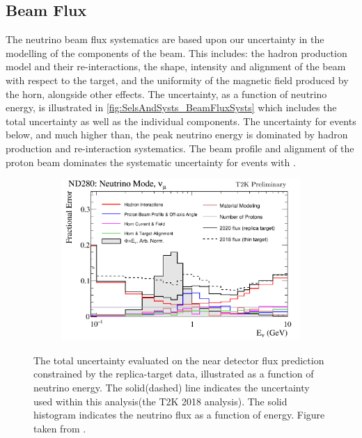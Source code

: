 \subsection{Beam Flux}
\label{sec:SelsAndSysts_Systs_BeamFlux}

The neutrino beam flux systematics are based upon our uncertainty in the modelling of the components of the beam. This includes: the hadron production model and their re-interactions, the shape, intensity and alignment of the beam with respect to the target, and the uniformity of the magnetic field produced by the horn, alongside other effects. The uncertainty, as a function of neutrino energy, is illustrated in \autoref{fig:SelsAndSysts_BeamFluxSysts} which includes the total uncertainty as well as the individual components. The uncertainty for events below, and much higher than, the peak neutrino energy is dominated by hadron production and re-interaction systematics. The beam profile and alignment of the proton beam dominates the systematic uncertainty for events with . 

\begin{figure}[h]
  \begin{subfigure}[t]{\textwidth}
    \includegraphics[width=\textwidth, trim={0mm 0mm 0mm 0mm}, clip,page=1]{Figures/Selections/flux_uncertainty_covariance_plots_addcorrnd_compwv3_flux_error_t2k_nd5_fhc_numu.pdf}
  \end{subfigure}
  \caption{The total uncertainty evaluated on the near detector \quickmath{\nu_{\mu}} flux prediction constrained by the replica-target data, illustrated as a function of neutrino energy. The solid(dashed) line indicates the uncertainty used within this analysis(the T2K 2018 analysis). The solid histogram indicates the neutrino flux as a function of energy. Figure taken from \cite{t2k_tn_354}.}
  \label{fig:SelsAndSysts_BeamFluxSysts}
\end{figure}

